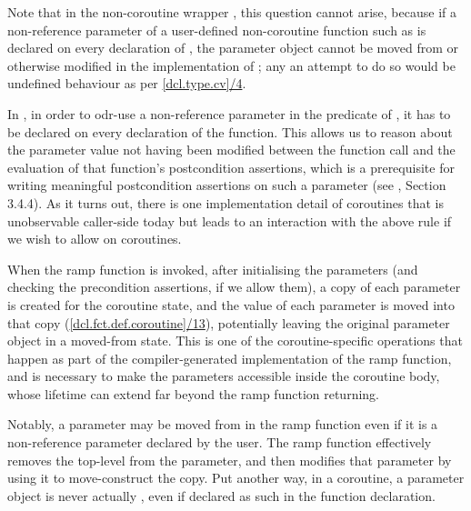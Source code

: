 Note that in the non-coroutine wrapper , this question cannot arise, because if a non-reference parameter of a user-defined non-coroutine function such as  is declared  on every declaration of , the parameter object cannot be moved from or otherwise modified in the implementation of ; any an attempt to do so would be undefined behaviour as per \href{https://eel.is/c++draft/dcl.type.cv#4.sentence-1}{[dcl.type.cv]/4}.


In \cite{P2900R8}, in order to odr-use a non-reference parameter in the predicate of , it has to be declared  on every declaration of the function. This allows us to reason about the parameter value not having been modified between the function call and the evaluation of that function's postcondition assertions, which is a prerequisite for writing meaningful postcondition assertions on such a parameter (see \cite{P2900R8}, Section 3.4.4). As it turns out, there is one implementation detail of coroutines that is unobservable caller-side today but leads to an interaction with the above rule if we wish to allow  on coroutines.

When the ramp function is invoked, after initialising the parameters (and checking the precondition assertions, if we allow them), a copy of each parameter is created for the coroutine state, and the value of each parameter is moved into that copy (\href{https://eel.is/c++draft/dcl.fct.def.coroutine#13}{[dcl.fct.def.coroutine]/13}), potentially leaving the original parameter object in a moved-from state. This is one of the coroutine-specific operations that happen as part of the compiler-generated implementation of the ramp function, and is necessary to make the parameters accessible inside the coroutine body, whose lifetime can extend far beyond the ramp function returning.

Notably, a parameter may be moved from in the ramp function even if it is a non-reference parameter declared  by the user. The ramp function effectively removes the top-level  from the parameter, and then modifies that parameter by using it to move-construct the copy. Put another way, in a coroutine, a parameter object is never actually , even if declared as such in the function declaration.

